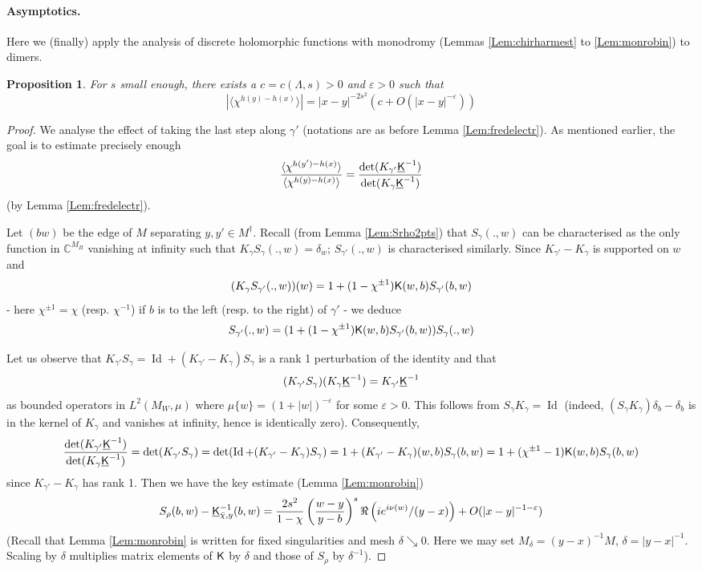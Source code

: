 \documentclass[10pt]{article}
\newcommand{\C}{\mathbb{C}}
\newcommand{\eps}{\varepsilon}
\newcommand{\rK}{{\sf K}}
\newcommand{\uK}{{\underline {\sf K}}}
\newcommand{\dg}{\dagger}
\DeclareMathOperator{\Id}{Id}
\newtheorem{Prop}[thm]{Proposition}
\begin{document}
\paragraph{Asymptotics.\\}

Here we (finally) apply the analysis of discrete holomorphic functions with monodromy (Lemmas \ref{Lem:chirharmest} to \ref{Lem:monrobin}) to dimers.

\begin{Prop}\label{Prop:electrsmalls}
For $s$ small enough, there exists a $c=c(\Lambda,s)> 0$  and $\eps>0$ such that 
$$|\langle \chi^{h(y)-h(x)}\rangle|=|x-y|^{-2s^2}(c+O(|x-y|^{-\eps}))$$
\end{Prop}
\begin{proof}
We analyse the effect of taking the last step along $\gamma'$ (notations are as before Lemma \ref{Lem:fredelectr}). As mentioned earlier, the goal is to estimate precisely enough
$$\frac{\langle \chi^{h(y')-h(x)}\rangle}{\langle \chi^{h(y)-h(x)}\rangle}=
\frac{\det(K_{\gamma'}\uK^{-1})}{\det(K_{\gamma}\uK^{-1})}
$$
(by Lemma \ref{Lem:fredelectr}).

Let $(bw)$ be the edge of $M$ separating $y,y'\in M^\dg$. Recall (from Lemma \ref{Lem:Srho2pts}) that $S_{\gamma}(.,w)$ can be characterised as the only function in $\C^{M_B}$ vanishing at infinity such that $K_\gamma S_{\gamma}(.,w)=\delta_w$; $S_{\gamma'}(.,w)$ is characterised similarly. Since $K_{\gamma'}-K_\gamma$ is supported on $w$ and 
$$(K_{\gamma}S_{\gamma'}(.,w))(w)=1+(1-\chi^{\pm 1}) \rK(w,b)S_{\gamma'}(b,w)$$
- here $\chi^{\pm 1}=\chi$ (resp. $\chi^{-1}$) if $b$ is to the left (resp. to the right) of $\gamma'$ - we deduce
$$S_{\gamma'}(.,w)=(1+(1-\chi^{\pm 1}) \rK(w,b)S_{\gamma'}(b,w))S_\gamma(.,w)$$

Let us observe that $K_{\gamma'} S_{\gamma}=\Id+(K_{\gamma'}-K_{\gamma})S_{\gamma}$ is a rank 1 perturbation of the identity and that
$$(K_{\gamma'} S_{\gamma})(K_{\gamma}\uK^{-1})=K_{\gamma'} \uK^{-1}$$
as bounded operators in $L^2(M_W,\mu)$ where $\mu\{w\}=(1+|w|)^{-\eps}$ for some $\eps>0$. This follows from $S_{\gamma}K_{\gamma}=\Id$ (indeed, $(S_{\gamma}K_{\gamma})\delta_b-\delta_b$ is in the kernel of $K_{\gamma}$ and vanishes at infinity, hence is identically zero). Consequently,
$$\frac{\det(K_{\gamma'}\uK^{-1})}{\det(K_{\gamma}\uK^{-1})}
=\det(K_{\gamma'}S_\gamma)=\det(\Id+(K_{\gamma'}-K_\gamma)S_\gamma)=1+(K_{\gamma'}-K_\gamma)(w,b)S_\gamma(b,w)=1+(\chi^{\pm 1}-1)\rK(w,b)S_\gamma(b,w)
$$
since $K_{\gamma'}-K_\gamma$ has rank 1. Then we have the key estimate (Lemma \ref{Lem:monrobin})
$$S_\rho(b,w)-\uK_{\bar\chi,y}^{-1}(b,w)=\frac{2s^2}{1-\chi}\left(\frac{w-y}{y-b}\right)^s\Re\left(ie^{i\nu(w)}/(y-x)\right)+O(|x-y|^{-1-\eps})$$
(Recall that Lemma \ref{Lem:monrobin} is written for fixed singularities and mesh $\delta\searrow 0$. Here we may set $M_\delta=(y-x)^{-1}M$, $\delta=|y-x|^{-1}$. Scaling by $\delta$ multiplies matrix elements of $\rK$ by $\delta$ and those of $S_\rho$ by $\delta^{-1}$).


\end{proof}
\end{document}
